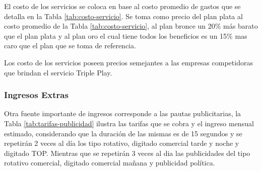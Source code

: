 \begin{itemize}
El costo de los servicios se coloca en base al costo promedio de gastos que se detalla en la Tabla \ref{tab:costo-servicio}. Se toma como precio del plan plata al costo promedio de la Tabla \ref{tab:costo-servicio}, al plan bronce un 20\% más barato que el plan plata y al plan oro el cual tiene todos los beneficios es un 15\% mas caro que el plan que se toma de referencia. 

Los costo de los servicios poseen precios semejantes a las  empresas competidoras que brindan el servicio
Triple Play.


\subsubsection{Ingresos Extras}
Otra fuente importante de ingresos corresponde a las pautas publicitarias, la Tabla \ref{tab:tarifas-publicidad} ilustra las tarifas
que se cobra y el ingreso mensual estimado, considerando que la duración de las mismas es de 15 segundos
y se repetirán 2 veces al día los tipo rotativo, digitado comercial tarde y noche y digitado TOP. Mientras que se repetirán 3 veces al dia las publicidades del tipo rotativo comercial, digitado comercial mañana y publicidad política.




\end{itemize}
